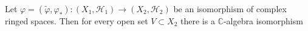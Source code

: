 Let $\varphi = (\tilde{\varphi}, \varphi_*): (X_1, \mathcal{H}_1) \rightarrow (X_2, \mathcal{H}_2)$ be an isomorphism of complex ringed spaces. Then for every open set $V \subset X_2$ there is a $\mathbb{C}$-algebra isomorphism
